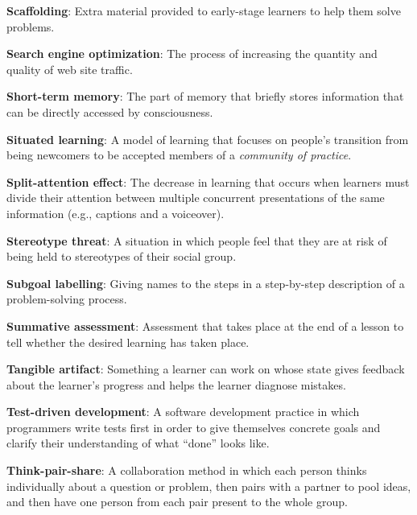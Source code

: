 \textbf{\hypertarget{g:scaffolding}{Scaffolding}\label{g:scaffolding}}: Extra material provided to
early-stage learners to help them solve problems.

\textbf{\hypertarget{g:seo}{Search engine optimization}\label{g:seo}}: The process of increasing
the quantity and quality of web site traffic.

\textbf{\hypertarget{g:short-term-memory}{Short-term memory}\label{g:short-term-memory}}: The part of memory
that briefly stores information that can be directly accessed by
consciousness.

\textbf{\hypertarget{g:situated-learning}{Situated learning}\label{g:situated-learning}}: A model of learning
that focuses on people's transition from being newcomers to be accepted
members of a \emph{community of practice}.

\textbf{\hypertarget{g:split-attention-effect}{Split-attention effect}\label{g:split-attention-effect}}: The
decrease in learning that occurs when learners must divide their
attention between multiple concurrent presentations of the same
information (e.g., captions and a voiceover).

\textbf{\hypertarget{g:stereotype-threat}{Stereotype threat}\label{g:stereotype-threat}}: A situation in
which people feel that they are at risk of being held to stereotypes of
their social group.

\textbf{\hypertarget{g:subgoal-labelling}{Subgoal labelling}\label{g:subgoal-labelling}}: Giving names to the
steps in a step-by-step description of a problem-solving process.

\textbf{\hypertarget{g:summative-assessment}{Summative assessment}\label{g:summative-assessment}}: Assessment
that takes place at the end of a lesson to tell whether the desired
learning has taken place.

\textbf{\hypertarget{g:tangible-artifact}{Tangible artifact}\label{g:tangible-artifact}}: Something a learner
can work on whose state gives feedback about the learner's progress and
helps the learner diagnose mistakes.

\textbf{\hypertarget{g:test-driven-development}{Test-driven development}\label{g:test-driven-development}}: A
software development practice in which programmers write tests first in
order to give themselves concrete goals and clarify their understanding
of what ``done'' looks like.

\textbf{\hypertarget{g:think-pair-share}{Think-pair-share}\label{g:think-pair-share}}: A collaboration
method in which each person thinks individually about a question or
problem, then pairs with a partner to pool ideas, and then have one
person from each pair present to the whole group.

